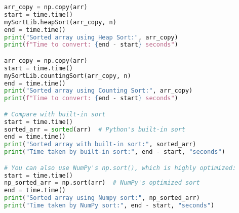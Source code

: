 \documentclass[12pt]{article}
\begin{document}
\begin{lstlisting}[language=python]
arr_copy = np.copy(arr)
start = time.time()
mySortLib.heapSort(arr_copy, n)
end = time.time()
print("Sorted array using Heap Sort:", arr_copy)
print(f"Time to convert: {end - start} seconds")

arr_copy = np.copy(arr)
start = time.time()
mySortLib.countingSort(arr_copy, n)
end = time.time()
print("Sorted array using Counting Sort:", arr_copy)
print(f"Time to convert: {end - start} seconds")

# Compare with built-in sort
start = time.time()
sorted_arr = sorted(arr)  # Python's built-in sort
end = time.time()
print("Sorted array with built-in sort:", sorted_arr)
print("Time taken by built-in sort:", end - start, "seconds")

# You can also use NumPy's np.sort(), which is highly optimized:
start = time.time()
np_sorted_arr = np.sort(arr)  # NumPy's optimized sort
end = time.time()
print("Sorted array using Numpy sort:", np_sorted_arr)
print("Time taken by NumPy sort:", end - start, "seconds")
\end{lstlisting}
\end{document}
